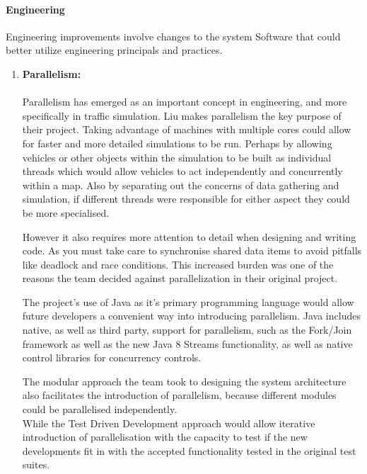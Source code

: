 \documentclass[11pt]{article}
\begin{document}
\paragraph{Engineering}
Engineering improvements involve changes to the system Software that could better utilize engineering principals and practices.
\begin{enumerate}
	\item \textbf{Parallelism:}
	\\~\\
	Parallelism has emerged as an important concept in engineering, and more specifically in traffic simulation. Liu \cite{website:phy-ntnu-traffic-simulation} makes parallelism the key purpose of their project. Taking advantage of machines with multiple cores could allow for faster and more detailed simulations to be run. Perhaps by allowing vehicles or other objects within the simulation to be built as individual threads which would allow vehicles to act independently and concurrently within a map. Also by separating out the concerns of data gathering and simulation, if different threads were responsible for either aspect they could be more specialised.
	
	However it also requires more attention to detail when designing and writing code. As you must take care to synchronise shared data items to avoid pitfalls like deadlock and race conditions. This increased burden was one of the reasons the team decided against parallelization in their original project.
	
	The project's use of Java as it's primary programming language would allow future developers a convenient way into introducing parallelism. Java includes native, as well as third party, support for parallelism, such as the Fork/Join framework\cite{LeaForkJoin} as well as the new Java 8 Streams functionality\cite{website:Oracle-Java-8}, as well as native control libraries for concurrency controls.
	
	The modular approach the team took to designing the system architecture also facilitates the introduction of parallelism, because different modules could be parallelised independently.
	\\While the Test Driven Development approach would allow iterative introduction of parallelisation with the capacity to test if the new developments fit in with the accepted functionality tested in the original test suites.
	

\end{enumerate}
\end{document}
